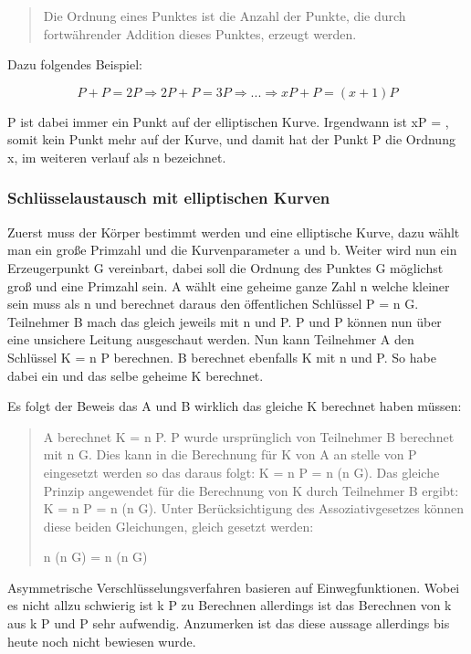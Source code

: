 			\begin{quote}
				\begin{defi}
					Die Ordnung eines Punktes ist die Anzahl der Punkte, die durch fortwährender Addition dieses Punktes, erzeugt werden.\cite{Information:und:Kommunikation}
				\end{defi}
			\end{quote}
			
			Dazu folgendes Beispiel:
			
			\begin{displaymath}
			P + P = 2P \Rightarrow 2P +P = 3P \Rightarrow ... \Rightarrow xP + P = (x+1)P
			\end{displaymath}
			
			P ist dabei immer ein Punkt auf der elliptischen Kurve. Irgendwann ist xP = \myInfty, somit kein Punkt mehr auf der Kurve, und damit hat der Punkt P die Ordnung x, im weiteren verlauf als n bezeichnet.
			
		\subsubsection{Schlüsselaustausch mit elliptischen Kurven}
			Zuerst muss der Körper bestimmt werden und eine elliptische Kurve, dazu wählt man ein große Primzahl und die Kurvenparameter a und b. Weiter wird nun ein Erzeugerpunkt G vereinbart, dabei soll die Ordnung des Punktes G möglichst groß und eine Primzahl sein. A wählt eine geheime ganze Zahl n welche kleiner sein muss als n und berechnet daraus den öffentlichen Schlüssel P = n \mycdot G. Teilnehmer B mach das gleich jeweils mit n und P. P und P können nun über eine unsichere Leitung ausgeschaut werden. Nun kann Teilnehmer A den Schlüssel K = n \mycdot P berechnen. B berechnet ebenfalls K mit n und P. So habe dabei ein und das selbe geheime K berechnet.
			
			Es folgt der Beweis das A und B wirklich das gleiche K berechnet haben müssen:
			\begin{quote}
				\begin{beweis}
					A berechnet K = n \mycdot P\myTiefstellen{B}. P wurde ursprünglich von Teilnehmer B berechnet mit n \mycdot G. Dies kann in die Berechnung für K von A an stelle von P eingesetzt werden so das daraus folgt: K = n \mycdot P = n \mycdot (n \mycdot G). Das gleiche Prinzip angewendet für die Berechnung von K durch Teilnehmer B ergibt: K = n \mycdot P = n \mycdot (n \mycdot G). Unter Berücksichtigung des Assoziativgesetzes können diese beiden Gleichungen, gleich gesetzt werden:
					
					\centering n \mycdot (n \mycdot G) = n \mycdot (n\myTiefstellen{A} \mycdot G)
				\end{beweis}
			\end{quote}
			
			Asymmetrische Verschlüsselungsverfahren basieren auf Einwegfunktionen. Wobei es nicht allzu schwierig ist k \mycdot P zu Berechnen allerdings ist das Berechnen von k aus k \mycdot P und P sehr aufwendig. Anzumerken ist das diese aussage allerdings bis heute noch nicht bewiesen wurde.
